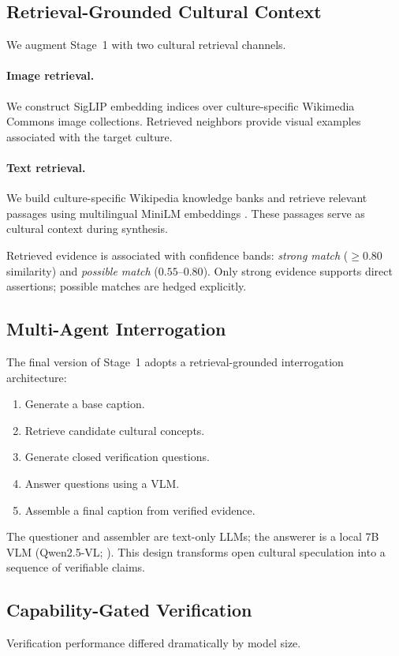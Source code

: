 \documentclass[11pt]{article}
\begin{document}
\subsection{Retrieval-Grounded Cultural Context}
We augment Stage~1 with two cultural retrieval channels.

\paragraph{Image retrieval.} We construct SigLIP \citep{zhai2023siglip}
embedding indices over culture-specific Wikimedia Commons image collections.
Retrieved neighbors provide visual examples associated with the target
culture.

\paragraph{Text retrieval.} We build culture-specific Wikipedia knowledge
banks and retrieve relevant passages using multilingual MiniLM embeddings
\citep{reimers2020multilingual}. These passages serve as cultural context
during synthesis.

Retrieved evidence is associated with confidence bands: \emph{strong match}
($\geq 0.80$ similarity) and \emph{possible match} ($0.55$--$0.80$). Only
strong evidence supports direct assertions; possible matches are hedged
explicitly.

\subsection{Multi-Agent Interrogation}
The final version of Stage~1 adopts a retrieval-grounded interrogation
architecture:
\begin{enumerate}
  \item Generate a base caption.
  \item Retrieve candidate cultural concepts.
  \item Generate closed verification questions.
  \item Answer questions using a VLM.
  \item Assemble a final caption from verified evidence.
\end{enumerate}
The questioner and assembler are text-only LLMs; the answerer is a local 7B
VLM (Qwen2.5-VL; \citealp{qwen2025qwen25vl}). This design transforms open
cultural speculation into a sequence of verifiable claims.

\subsection{Capability-Gated Verification}
Verification performance differed dramatically by model size.
\end{document}
